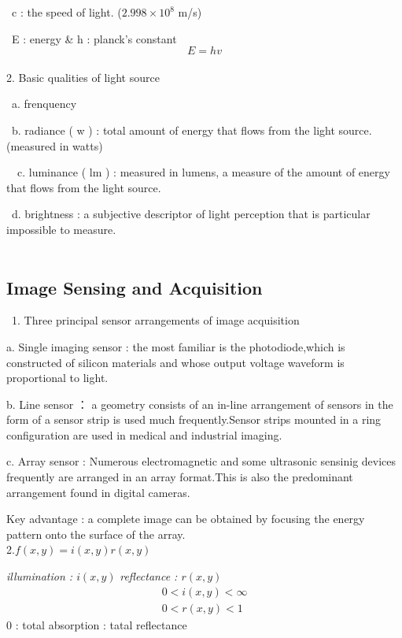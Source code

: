 \documentclass[12pt]{article}
\begin{document}
\ c : the speed of light. (\begin{math} 2.998 \times 10^8 \end{math} m/s)

\ E : energy \&  h : planck's constant 
\begin{displaymath}
E=hv
\end{displaymath}
\\
2. Basic qualities of light source

\ a. frenquency

\ b. radiance ( w ) : total amount of energy that flows from the light source.(measured in watts)

\ \ c. luminance ( lm ) : measured in lumens, a measure of the amount of energy that flows from the light source.
 
\ d. brightness : a subjective descriptor of light perception that is particular impossible to measure.\\
\\
\subsection{Image Sensing and Acquisition}\
1. Three principal sensor arrangements of image acquisition

a. Single imaging sensor : the most familiar is the photodiode,which is constructed of silicon materials and whose output voltage waveform is proportional to light.

b. Line sensor ： a geometry consists of an in-line arrangement of sensors in the form of a sensor strip is used much frequently.Sensor strips mounted in a ring configuration are used in medical and industrial imaging.

c. Array sensor : Numerous electromagnetic and some ultrasonic sensinig devices frequently are arranged in an array format.This is also the predominant arrangement found in digital cameras.

Key advantage : a complete image can be obtained by focusing the energy pattern onto the surface of the array.
\\
2.\begin{math} f(x,y) = i(x,y)r(x,y)\end{math}

\textsl{illumination : \begin{math} i(x,y) \end{math}} \qquad \textsl{reflectance : \begin{math} r(x,y) \end{math} }
\begin{eqnarray}
0<i(x,y)<\infty\\
0<r(x,y)<1
\end{eqnarray}
0 : total absorption  : tatal reflectance 
\end{document}
